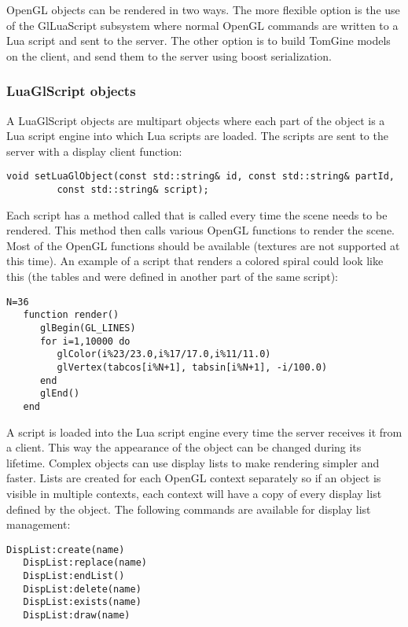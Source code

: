 OpenGL objects can be rendered in two ways. The more flexible option is the use
of the GlLuaScript subsystem where normal OpenGL commands are written to a Lua
script and sent to the server. The other option is to build TomGine models on
the client, and send them to the server using boost serialization. 


\subsubsection{LuaGlScript objects}

A LuaGlScript objects are multipart objects where each part of the object is a
Lua script engine into which Lua scripts are loaded. The scripts are sent to
the server with a display client function:

\begin{Verbatim}[fontsize=\scriptsize,gobble=3]
   void setLuaGlObject(const std::string& id, const std::string& partId,
         const std::string& script);
\end{Verbatim}

Each script has a method called  that is called every time the
scene needs to be rendered.  This method then calls various OpenGL functions to
render the scene. Most of the OpenGL functions should be available (textures
are not supported at this time). An example of a script that renders a colored
spiral could look like this (the tables  and  were
defined in another part of the same script):

\begin{Verbatim}[fontsize=\scriptsize,gobble=3]
   N=36
   function render()
      glBegin(GL_LINES)
      for i=1,10000 do
         glColor(i%23/23.0,i%17/17.0,i%11/11.0)
         glVertex(tabcos[i%N+1], tabsin[i%N+1], -i/100.0)
      end
      glEnd()
   end
\end{Verbatim}

A script is loaded into the Lua script engine every time the server receives it
from a client. This way the appearance of the object can be changed during its
lifetime. Complex objects can use display lists to make rendering simpler and 
faster. Lists are created for each OpenGL context separately so if an object
is visible in multiple contexts, each context will have a copy of every
display list defined by the object.
The following commands are available for display list management:

\begin{Verbatim}[fontsize=\scriptsize,gobble=3]
   DispList:create(name)
   DispList:replace(name)
   DispList:endList()
   DispList:delete(name)
   DispList:exists(name)
   DispList:draw(name)
\end{Verbatim}


